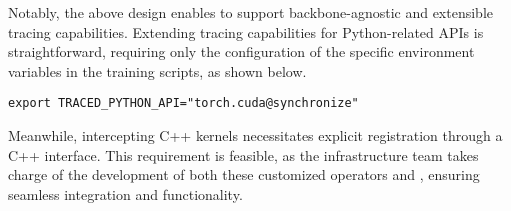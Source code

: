 Notably, the above design enables \sysname{} to support backbone-agnostic and extensible tracing capabilities. Extending tracing capabilities for Python-related APIs is straightforward, requiring only the configuration of the specific environment variables in the training scripts, as shown below.
\begin{verbatim}
export TRACED_PYTHON_API="torch.cuda@synchronize"
\end{verbatim}
Meanwhile, intercepting C++ kernels necessitates explicit registration through a C++ interface. This requirement is feasible, as the infrastructure team takes charge of the development of both these customized operators and \sysname{}, ensuring seamless integration and functionality.






